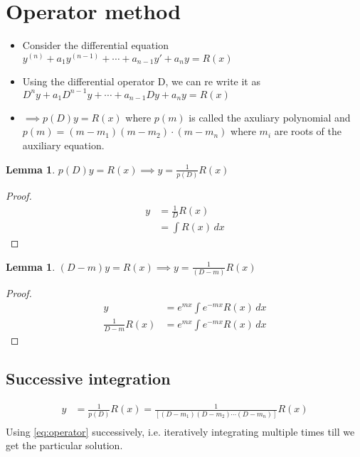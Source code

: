\documentclass[oneside,11pt,pdftex,final]{book}%
\numberwithin{equation}{section}
\newtheorem{lemma}[theorem]{Lemma}
\numberwithin{section}{chapter}
\numberwithin{equation}{chapter}
\begin{document}
\section{Operator method}
\begin{itemize}
	\item Consider the differential equation $ y^{(n)}+a_1y^{(n-1)}+\cdots+a_{n-1}y'+a_ny=R(x) $
	\item Using the differential operator D, we can re write it as $ D^ny+a_1 D^{n-1}y+\cdots+a_{n-1}Dy+a_ny=R(x) $
	\item $ \implies p(D)y=R(x)$ where $ p(m) $ is called the axuliary polynomial and $ p(m)=(m-m_1)(m-m_2)\cdot(m-m_n) $ where $ m_i $ are roots of the auxiliary equation.
\end{itemize}

\begin{lemma}
	$ p(D)y=R(x) \implies y= \frac{1}{p(D)}R(x) $
\end{lemma}
\begin{proof}
	\begin{align*}
		y&=\frac{1}{D}R(x)\\
		&=\int R(x)\, dx
	\end{align*}
\end{proof}
\begin{lemma}
	$ (D-m)y=R(x) \implies y = \frac{1}{(D-m)}R(x)$
\end{lemma}
\begin{proof}
	\begin{align}
		y&=e^{mx} \int e^{-mx} R(x)\, dx\\
		\frac{1}{D-m}R(x)&=e^{mx}\int e^{-mx} R(x)\, dx \label{eq:operator}
	\end{align}
\end{proof}

\subsection{Successive integration}
\begin{align*}
	y&=\frac{1}{p(D)} R(x)=\frac{1}{[(D-m_1)(D-m_2)\cdots (D-m_n)]} R(x)\\
\end{align*}
Using \ref{eq:operator} successively, i.e. iteratively integrating multiple times till we get the particular solution.
\end{document}
